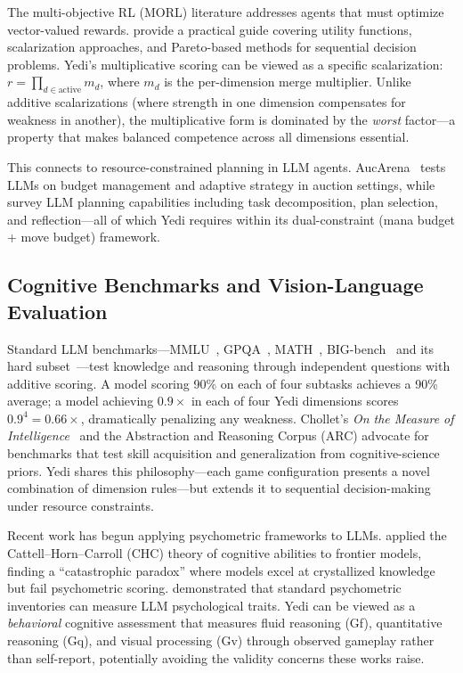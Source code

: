 \documentclass[11pt]{article}
\begin{document}
The multi-objective RL (MORL) literature addresses agents that must optimize
vector-valued rewards. \citet{hayes2022morl} provide a practical guide covering
utility functions, scalarization approaches, and Pareto-based methods for
sequential decision problems. Yedi's multiplicative scoring can be viewed as a
specific scalarization: $r = \prod_{d \in \text{active}} m_d$, where $m_d$ is
the per-dimension merge multiplier. Unlike additive scalarizations (where
strength in one dimension compensates for weakness in another), the
multiplicative form is dominated by the \emph{worst} factor---a property that
makes balanced competence across all dimensions essential.

This connects to resource-constrained planning in LLM agents.
AucArena~\citep{chen2024aucarena} tests LLMs on budget management and
adaptive strategy in auction settings, while \citet{huang2024planningsurvey}
survey LLM planning capabilities including task decomposition, plan selection,
and reflection---all of which Yedi requires within its dual-constraint
(mana budget + move budget) framework.

\subsection{Cognitive Benchmarks and Vision-Language Evaluation}

Standard LLM benchmarks---MMLU~\citep{hendrycks2021mmlu},
GPQA~\citep{rein2023gpqa}, MATH~\citep{hendrycks2021math},
BIG-bench~\citep{srivastava2023bigbench} and its hard
subset~\citep{suzgun2023bigbenchhard}---test knowledge and reasoning through
independent questions with additive scoring. A model scoring 90\% on each of
four subtasks achieves a 90\% average; a model achieving $0.9\times$ in each of
four Yedi dimensions scores $0.9^4 = 0.66\times$, dramatically penalizing any
weakness. Chollet's \emph{On the Measure of Intelligence}~\citep{chollet2019measure}
and the Abstraction and Reasoning Corpus (ARC) advocate for benchmarks that test
skill acquisition and generalization from cognitive-science priors. Yedi shares
this philosophy---each game configuration presents a novel combination of
dimension rules---but extends it to sequential decision-making under resource
constraints.

Recent work has begun applying psychometric frameworks to LLMs.
\citet{reddy2025chcllm} applied the Cattell--Horn--Carroll (CHC) theory of
cognitive abilities to frontier models, finding a ``catastrophic paradox''
where models excel at crystallized knowledge but fail psychometric scoring.
\citet{pellert2024aipsychometrics} demonstrated that standard psychometric
inventories can measure LLM psychological traits. Yedi can be viewed as a
\emph{behavioral} cognitive assessment that measures fluid reasoning (Gf),
quantitative reasoning (Gq), and visual processing (Gv) through observed
gameplay rather than self-report, potentially avoiding the validity concerns
these works raise.
\end{document}
